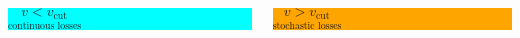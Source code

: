           \vspace{1em}
    \centering
    \begin{minipage}{0.7\linewidth}
    \begin{columns}
        \begin{column}{0.5\textwidth}
        \centering
        \colorbox{cyan}{
      \begin{minipage}{6.0cm}
        \centering
        $\underset{\text{continuous losses}}{v < v_\text{cut}}$
    \end{minipage}
      }
        \end{column}

        \begin{column}{0.5\textwidth}
        \centering
        \colorbox{orange}{
      \begin{minipage}{6.0cm}
          \centering
        $\underset{\text{stochastic losses}}{v > v_\text{cut}}$
    \end{minipage}
      }
        \end{column}
    \end{columns}
    \end{minipage}

    \vspace{-3em}


